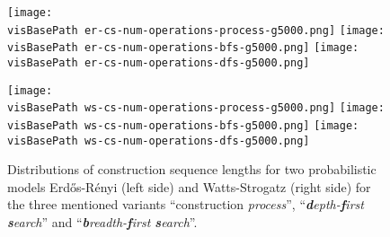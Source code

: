 \documentclass{article}
\newcommand{\visBasePath}[0]{vis/}
\begin{document}
\begin{figure*}
  \begin{minipage}[c]{0.48\linewidth}
    \texttt{[image: \\visBasePath er-cs-num-operations-process-g5000.png]}
    \texttt{[image: \\visBasePath er-cs-num-operations-bfs-g5000.png]}
    \texttt{[image: \\visBasePath er-cs-num-operations-dfs-g5000.png]}
  \end{minipage}\hfill
  \begin{minipage}[c]{0.48\linewidth}
    \texttt{[image: \\visBasePath ws-cs-num-operations-process-g5000.png]}
    \texttt{[image: \\visBasePath ws-cs-num-operations-bfs-g5000.png]}
    \texttt{[image: \\visBasePath ws-cs-num-operations-dfs-g5000.png]}
  \end{minipage}
  \caption{
    Distributions of construction sequence lengths for two probabilistic models Erdős-Rényi (left side) and Watts-Strogatz (right side) for the three mentioned variants ``construction \textit{process}'', ``\textit{\textbf{d}epth-\textbf{f}irst \textbf{s}earch}'' and ``\textit{\textbf{b}readth-\textbf{f}irst \textbf{s}earch}''.
  } \label{fig:num-operations}
\end{figure*}
 
\end{document}
